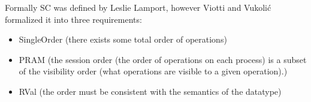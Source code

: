 \documentclass[a4paper,10pt,titlepage]{report}
\begin{document}
    Formally SC was defined by Leslie Lamport\cite{Lamport1979how}, however Viotti and Vukolić\cite{ConsistencyinNonTransactionalDistributedStorageSystems} formalized it into three requirements:
    \begin{itemize}
        \item SingleOrder (there exists some total order of operations)
        \item PRAM (the session order (the order of operations on each process) is a subset of the visibility order (what operations are visible to a given operation).)
        \item RVal (the order must be consistent with the semantics of the datatype)
    \end{itemize}







\end{document}
